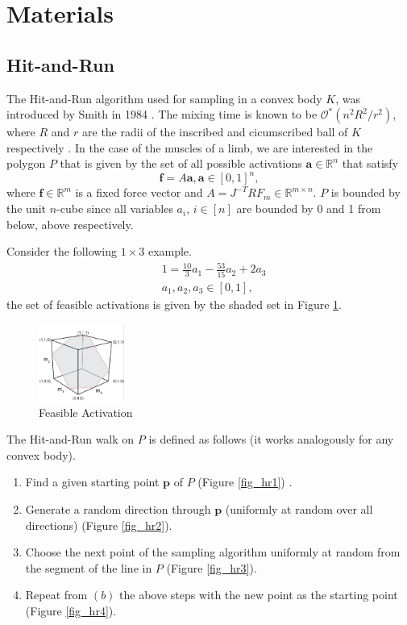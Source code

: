 \section{Materials}

\subsection{Hit-and-Run}
The Hit-and-Run algorithm used for sampling in a convex body $K$, was introduced by Smith in 1984 \cite{Smith}. The mixing time is known to be $\mathcal{O}^*(n^2R^2/r^2)$, where $R$ and $r$ are the radii of the inscribed and cicumscribed ball of $K$ respectively \cite{Dyer, Lovasz}.
In the case of the muscles of a limb, we are interested in the polygon $P$ that is given by the set of all possible activations $\textbf{a} \in \mathbb{R}^n$ that satisfy
\[\textbf{f} = A\textbf{a}, \textbf{a} \in [0,1]^n,\]
where $\textbf{f} \in \mathbb{R}^m$ is a fixed force vector and $A = J^{-T}RF_m \in \mathbb{R}^{m \times n}$. $P$ is bounded by the unit $n$-cube since all variables $a_i$, $i \in [n]$ are bounded by 0 and 1 from below, above respectively.

Consider the following $1 \times 3$ example.
\begin{align*}
&1 = \frac{10}{3}a_1 - \frac{53}{15}a_2 + 2a_3 \\
&a_1, a_2, a_3 \in [0,1],
\end{align*}
the set of feasible activations is given by the shaded set in Figure \ref{fig_hr}.

\begin{figure}[ht]
   \begin{center}
    \includegraphics[width=0.25\textwidth]{feasibleactivation.png}
  \end{center}
  \caption{Feasible Activation}
  \label{fig_hr}
\end{figure}

The Hit-and-Run walk on $P$ is defined as follows (it works analogously for any convex body). 
\begin{enumerate}
\item Find a given starting point $\textbf{p}$ of $P$ (Figure \ref{fig_hr1}) .
\item Generate a random direction through $\textbf{p}$ (uniformly at random over all directions) (Figure \ref{fig_hr2}).
\item Choose the next point of the sampling algorithm uniformly at random from the segment of the line in $P$ (Figure \ref{fig_hr3}). 
\item Repeat from $(b)$ the above steps with the new point as the starting point (Figure \ref{fig_hr4}).
\end{enumerate}


